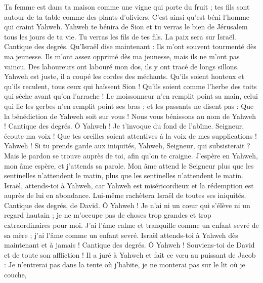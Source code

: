 \begin{multicols}{2}
Ta femme est dans ta maison comme une vigne qui porte du fruit ; tes fils sont autour de ta table comme des plants d'oliviers.
C’est ainsi qu’est béni l’homme qui craint Yahweh.
Yahweh te bénira de Sion et tu verras le bien de Jérusalem tous les jours de ta vie.
Tu verras les fils de tes fils. La paix sera sur Israël.
\VerseOne{}Cantique des degrés. Qu'Israël dise maintenant : Ils m'ont souvent tourmenté dès ma jeunesse.
Ils m'ont assez opprimé dès ma jeunesse, mais ils ne m’ont pas vaincu.
Des laboureurs ont labouré mon dos, ils y ont tracé de longs sillons.
Yahweh est juste, il a coupé les cordes des méchants.
Qu’ils soient honteux et qu’ils reculent, tous ceux qui haïssent Sion !
Qu’ils soient comme l'herbe des toits qui sèche avant qu’on l’arrache !
Le moissonneur n’en remplit point sa main, celui qui lie les gerbes n'en remplit point ses bras ;
et les passants ne disent pas : Que la bénédiction de Yahweh soit sur vous ! Nous vous bénissons au nom de Yahweh !
\VerseOne{}Cantique des degrés. Ô Yahweh ! Je t'invoque du fond de l’abîme.
Seigneur, écoute ma voix ! Que tes oreilles soient attentives à la voix de mes supplications !
Yahweh ! Si tu prends garde aux iniquités, Yahweh, Seigneur, qui subsisterait ?
Mais le pardon se trouve auprès de toi, afin qu’on te craigne.
J’espère en Yahweh, mon âme espère, et j’attends sa parole.
Mon âme attend le Seigneur plus que les sentinelles n'attendent le matin, plus que les sentinelles n'attendent le matin.
Israël, attends-toi à Yahweh, car Yahweh est miséricordieux et la rédemption est auprès de lui en abondance.
Lui-même rachètera Israël de toutes ses iniquités.
\VerseOne{}Cantique des degrés, de David. Ô Yahweh ! Je n’ai ni un cœur qui s’élève ni un regard hautain ; je ne m’occupe pas de choses trop grandes et trop extraordinaires pour moi.
J’ai l’âme calme et tranquille comme un enfant sevré de sa mère ; j’ai l’âme comme un enfant sevré.
Israël attends-toi à Yahweh dès maintenant et à jamais !
\VerseOne{}Cantique des degrés. Ô Yahweh ! Souviens-toi de David et de toute son affliction !
Il a juré à Yahweh et fait ce vœu au puissant de Jacob :
Je n’entrerai pas dans la tente où j’habite, je ne monterai pas sur le lit où je couche,

\end{multicols}
